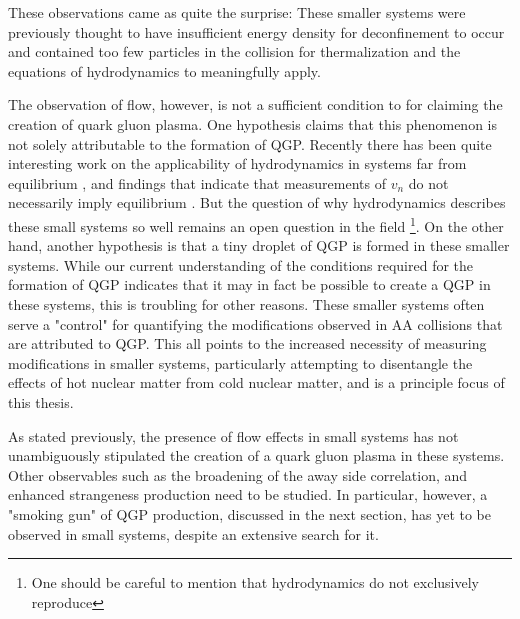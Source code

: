 These observations came as quite the surprise: These smaller systems were previously thought to have insufficient energy density for deconfinement to occur and contained too few particles in the collision for thermalization and the equations of hydrodynamics to meaningfully apply.


The observation of flow, however, is not a sufficient condition to for claiming the creation of quark gluon plasma. One hypothesis claims that this phenomenon is not solely attributable to the formation of QGP. Recently there has been quite interesting work on the applicability of hydrodynamics in systems far from equilibrium \cite{Romatschke2018a}, and findings that indicate that measurements of $v_n$ do not necessarily imply equilibrium \cite{Romatschke2017}. But the question of why hydrodynamics describes these small systems so well \cite{Habich2016, Zhao2018a} remains an open question in the field \footnote{One should be careful to mention that hydrodynamics do not exclusively reproduce}. On the other hand, another hypothesis is that a tiny droplet of QGP is formed in these smaller systems. While our current understanding of the conditions required for the formation of QGP indicates that it may in fact be possible to create a QGP in these systems, this is troubling for other reasons. These smaller systems often serve a "control" for quantifying the modifications observed in AA collisions that are attributed to QGP. This all points to the increased necessity of measuring modifications in smaller systems, particularly attempting to disentangle the effects of hot nuclear matter from cold nuclear matter, and is a principle focus of this thesis.

As stated previously, the presence of flow effects in small systems has not unambiguously stipulated the creation of a quark gluon plasma in these systems.  Other observables such as the broadening of the away side correlation, and enhanced strangeness production need to be studied. In particular, however, a "smoking gun" of QGP production, discussed in the next section, has yet to be observed in small systems, despite an extensive search for it.



